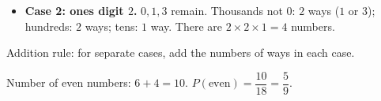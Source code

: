 {\begin{itemize}[leftmargin=1.2em,itemsep=1pt,topsep=1pt]
\item \textbf{Case 2: ones digit $2$.} $0,1,3$ remain. Thousands not $0$: $2$ ways ($1$ or $3$); hundreds: $2$ ways; tens: $1$ way. There are $2\times2\times1=4$ numbers.
\end{itemize}
\begin{recallbox}Addition rule: for separate cases, add the numbers of ways in each case.\end{recallbox}
Number of even numbers: $6+4=10$.
$P(\text{even})=\dfrac{10}{18}=\dfrac59$.
}

